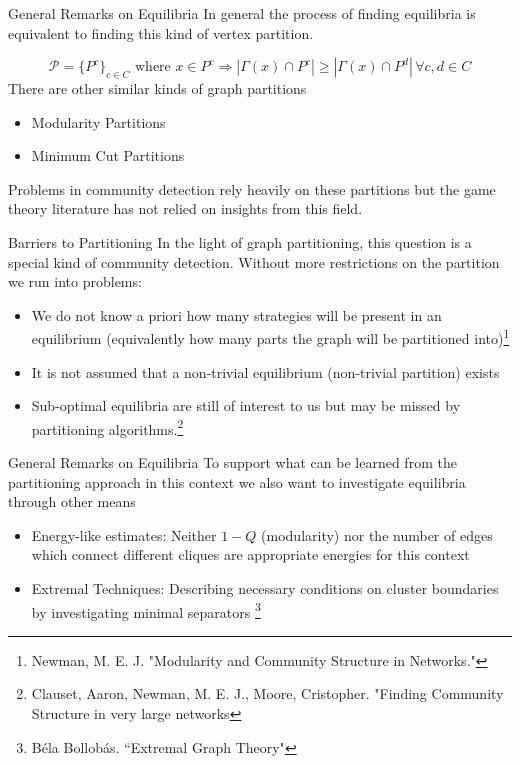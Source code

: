 \documentclass{beamer}
\begin{document}
\begin{frame}{General Remarks on Equilibria}
	In general the process of finding equilibria is equivalent to finding this kind of vertex partition.
	
	\begin{equation}
		\mathcal{P}= \{P^{c}\}_{c\in C} \text{ where } x\in P^{c}\Rightarrow |\Gamma(x)\cap P^{c}|\geq |\Gamma(x)\cap P^{d}|\, \forall c,d \in C 
	\end{equation}
	There are other similar kinds of graph partitions
	\begin{itemize}
		\item Modularity Partitions
		\item Minimum Cut Partitions
	\end{itemize}
	Problems in community detection rely heavily on these partitions but the game theory literature has not relied on insights from this field. 
\end{frame}

\begin{frame}{Barriers to Partitioning}
	In the light of graph partitioning, this question is a special kind of community detection. Without more restrictions on the partition we run into problems: 
	\begin{itemize}
		\item We do not know a priori how many strategies will be present in an equilibrium (equivalently how many parts the graph will be partitioned into)\footnote{Newman, M. E. J. "Modularity and Community Structure in Networks."}
		\item It is not assumed that a non-trivial equilibrium (non-trivial partition) exists
		\item Sub-optimal equilibria are still of interest to us but may be missed by partitioning algorithms.\footnote{Clauset, Aaron, Newman, M. E. J., Moore, Cristopher. "Finding Community Structure in very large networks}  
	\end{itemize}
\end{frame}

\begin{frame}{General Remarks on Equilibria}
	To support what can be learned from the partitioning approach in this context we also want to investigate equilibria through other means
	
	\begin{itemize}
		\item Energy-like estimates: Neither $1-Q$ (modularity) nor the number of edges which connect different cliques are appropriate energies for this context
		\item Extremal Techniques: Describing necessary conditions on cluster boundaries by investigating minimal separators \footnote{B\'ela Bollob\'as. ``Extremal Graph Theory"}
	\end{itemize}
\end{frame}
\end{document}
